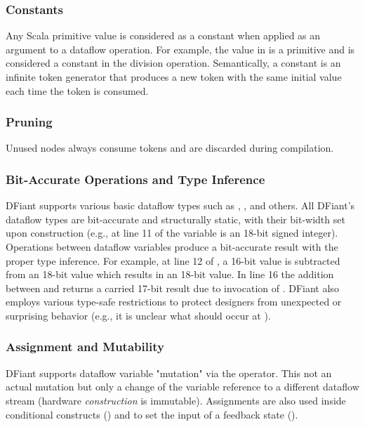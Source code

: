\subsubsection{Constants} 
Any Scala primitive value is considered as a constant when applied as an argument to a dataflow operation. For example, the value  in  is a primitive  and is considered a constant in the division operation. Semantically, a constant is an infinite token generator that produces a new token with the same initial value each time the token is consumed.

\subsubsection{Pruning}
Unused nodes always consume tokens and are discarded during compilation. 

\subsubsection{Bit-Accurate Operations and Type Inference}
DFiant supports various basic dataflow types such as , , and others.
All DFiant's dataflow types are bit-accurate and structurally static, with their bit-width set upon construction (e.g., at line 11 of  the variable  is an 18-bit signed integer). Operations between dataflow variables produce a bit-accurate result with the proper type inference. For example, at line 12 of , a 16-bit value is subtracted from an 18-bit value which results in an 18-bit value. In line 16 the addition between  and  returns a carried 17-bit result due to invocation of . DFiant also employs various type-safe restrictions to protect designers from unexpected or surprising behavior (e.g., it is unclear what should occur at ).

\subsubsection{Assignment and Mutability}
\label{sec:mutability}
DFiant supports dataflow variable "mutation" via the \code{:=} operator. This not an actual mutation but only a change of the variable reference to a different dataflow stream (hardware \emph{construction} is immutable). Assignments are also used inside conditional constructs () and to set the input of a feedback state ().

